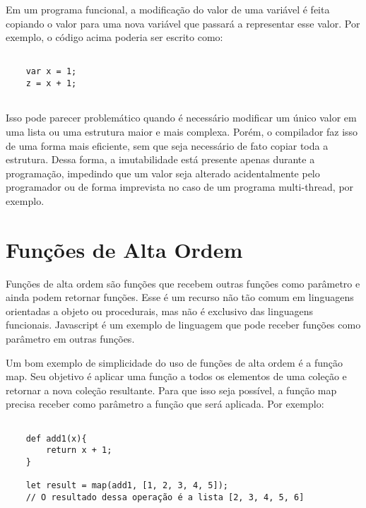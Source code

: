 Em um programa funcional, a modificação do valor 
de uma variável é feita copiando o valor para uma 
nova variável que passará a representar esse valor\cite{functionalscala}.
Por exemplo, o código acima poderia ser escrito 
como:

\begin{lstlisting}[caption={Exemplo de Código Imutável},label=imutablevar]

    var x = 1;
    z = x + 1;


\end{lstlisting}

Isso pode parecer problemático quando é necessário 
modificar um único valor em uma lista ou uma estrutura 
maior e mais complexa. Porém, o compilador faz isso 
de uma forma mais eficiente, sem que seja 
necessário de fato copiar toda a estrutura\cite{functionalscala}. 
Dessa forma, a imutabilidade está presente apenas durante a 
programação, impedindo que um valor seja alterado 
acidentalmente pelo programador ou de forma imprevista 
no caso de um programa multi-thread, por exemplo.



\section{Funções de Alta Ordem}

Funções de alta ordem são funções que recebem 
outras funções como parâmetro e ainda podem 
retornar funções\cite{realworldhaskell, functionalscala}. Esse é um recurso 
não tão comum em linguagens orientadas a 
objeto ou procedurais, mas não é exclusivo das 
linguagens funcionais. Javascript é um 
exemplo de linguagem que pode receber funções 
como parâmetro em outras funções\cite{eloquentjs}.

Um bom exemplo de simplicidade do uso de 
funções de alta ordem é a função map\cite{hofscala}. Seu objetivo 
é aplicar uma função a todos os elementos de uma 
coleção e retornar a nova coleção resultante. 
Para que isso seja possível, a função map precisa 
receber como parâmetro a função que será aplicada. 
Por exemplo:

\begin{lstlisting}[caption={Exemplo de Função de Alta Ordem},label=hof]

    def add1(x){
        return x + 1;
    }

    let result = map(add1, [1, 2, 3, 4, 5]);
    // O resultado dessa operação é a lista [2, 3, 4, 5, 6]
        

\end{lstlisting}

